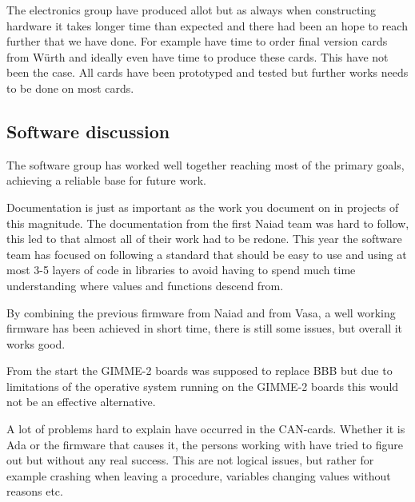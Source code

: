 The electronics group have produced allot but as always when constructing hardware it takes longer time than expected and there had been an hope to reach further that we have done. For example have time to order final version cards from Würth and ideally even have time to produce these cards. This have not been the case. All cards have been prototyped and tested but further works needs to be done on most cards. 

\subsection{Software discussion}
\noindent
The software group has worked well together reaching most of the primary goals, achieving a reliable base for future work.

Documentation is just as important as the work you document on in projects of this magnitude. The documentation from the first Naiad team was hard to follow, this led to that almost all of their work had to be redone.
This year the software team has focused on following a standard that should be easy to use and using at most 3-5 layers of code in libraries to avoid having to spend much time understanding where values and functions descend from.

By combining the previous firmware from Naiad and from Vasa, a well working firmware has been achieved in short time, there is still some issues, but overall it works good.

From the start the GIMME-2 boards was supposed to replace BBB but due to limitations of the operative system running on the GIMME-2 boards this would not be an effective alternative.

A lot of problems hard to explain have occurred in the CAN-cards. Whether it is Ada or the firmware that causes it, the persons working with have tried to figure out but without any real success. This are not logical issues, but rather for example crashing when leaving a procedure, variables changing values without reasons etc.
